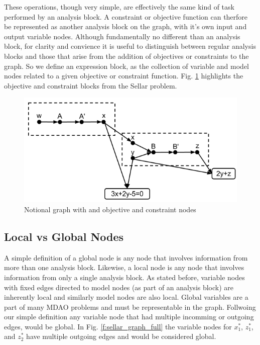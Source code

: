 These operations, though very simple, are effectively the same kind of task 
performed by an analysis block. A constraint or objective function can therfore 
be represented as another analysis block on the graph, with it's own input and 
output variable nodes. Although fundamentally no different than an analysis block, 
for clarity and convience it is useful to distinguish between regular analysis 
blocks and those that arise from the addition of objectives or constraints to 
the graph. So we define an expression block, as the collection of variable and model 
nodes related to a given objective or constraint function. Fig. \ref{f:obj-cons}
highlights the objective and constraint blocks from the Sellar problem. 


\begin{figure}[htb!]
  \begin{center}
    \includegraphics[width=.6\textwidth]{images/obj_const_graph}
  \end{center}
  \caption{Notional graph with and objective and constraint nodes \label{f:obj-cons}}
\end{figure}


\subsection{Local vs Global Nodes}

  A simple definition of a global node is any node that involves information 
  from more than one analysis block. Likewise, a local node is any node 
  that involves information from only a single analysis block. As stated before, variable 
  nodes with fixed edges directed to model nodes (as part of an analysis block) are inherently local 
  and similarly model nodes are also local. Global variables are a part of many 
  MDAO problems and must be representable in the graph. Follwoing our simple definition
  any variable node that had multiple incomming or outgoing edges, would be global. 
  In Fig. \ref{f:sellar_graph_full} the variable nodes for $x_1^*$, $z_1^*$, and $z_2^*$ 
  have multiple outgoing edges and would be considered global. 

